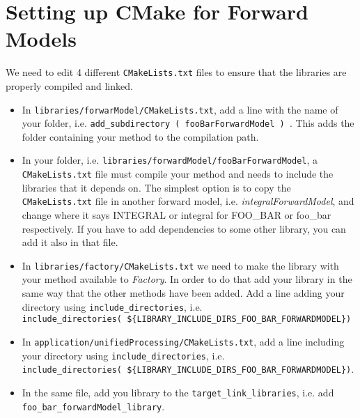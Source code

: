 \documentclass{article}
\begin{document}
\section{Setting up CMake for Forward Models}
We need to edit 4 different \texttt{CMakeLists.txt} files to ensure that the libraries are properly compiled and linked.
\begin{itemize}
    \item In \texttt{libraries/forwarModel/CMakeLists.txt}, add a line with the name of your folder, i.e. \texttt{add\_subdirectory ( fooBarForwardModel ) }. This adds the folder containing your method to the compilation path.
    \item In your folder, i.e. \texttt{libraries/forwardModel/fooBarForwardModel}, a \texttt{CMakeLists.txt} file must compile your method and needs to include the libraries that it depends on. The simplest option is to copy the \texttt{CMakeLists.txt} file in another forward model, i.e. \textit{integralForwardModel}, and change where it says INTEGRAL or integral for FOO\_BAR or foo\_bar respectively. If you have to add dependencies to some other library, you can add it also in that file.
    \item In \texttt{libraries/factory/CMakeLists.txt} we need to make the library with your method available to \textit{Factory}. In order to do that add your library in the same way that the other methods have been added. Add a line adding your directory using \texttt{include\_directories}, i.e.\\\texttt{include\_directories( \$\{LIBRARY\_INCLUDE\_DIRS\_FOO\_BAR\_FORWARDMODEL\})}
    \item In \texttt{application/unifiedProcessing/CMakeLists.txt}, add a line including your directory using \texttt{include\_directories}, i.e. \\\texttt{include\_directories( \$\{LIBRARY\_INCLUDE\_DIRS\_FOO\_BAR\_FORWARDMODEL\})}.
    \item In the same file, add you library to the \texttt{target\_link\_libraries}, i.e. add \texttt{foo\_bar\_forwardModel\_library}.
\end{itemize}
\end{document}
